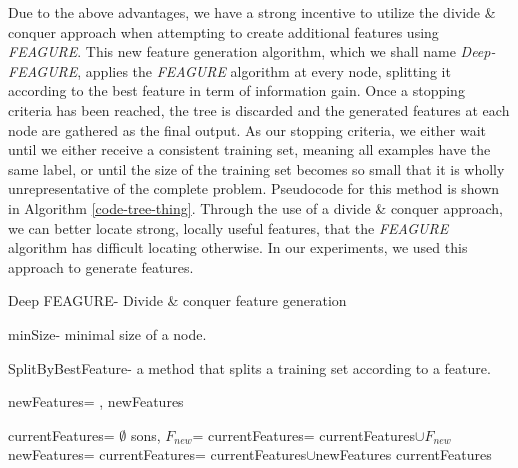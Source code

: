 \documentclass[twoside,11pt]{article}
\theoremstyle{definition}
\begin{document}
Due to the above advantages, we have a strong incentive to utilize the divide \& conquer approach when attempting to create additional features using \emph{FEAGURE}. This new feature generation algorithm, which we shall name \emph{Deep-FEAGURE}, applies the \emph{FEAGURE} algorithm at every node, splitting it according to the best feature in term of information gain. Once a stopping criteria has been reached, the tree is discarded and the generated features at each node are gathered as the final output.
As our stopping criteria, we either wait until we either receive a consistent training set, meaning all examples have the same label, or until the size of the training set becomes so small that it is wholly unrepresentative of the complete problem. 
Pseudocode for this method is shown in Algorithm \ref{code-tree-thing}.
Through the use of a divide \& conquer approach, we can better locate strong, locally useful features, that the \emph{FEAGURE} algorithm has difficult locating otherwise. In our experiments, we used this approach to generate features.

\begin{algorithm}[H]
	\caption{Deep FEAGURE- Divide \& conquer feature generation}
	\label{code-tree-thing}
	\small
	minSize- minimal size of a node.
	
	SplitByBestFeature- a method that splits a training set according to a feature.
	
	\begin{algorithmic}
		\State
		\Return 
		\EndIf
		\State newFeatures=
		\State \Return {}, newFeatures
		\EndFunction
		
		
		\State 
		\State currentFeatures= $\emptyset$
		\State sons, $F_{new}$=
		\State currentFeatures= currentFeatures$\cup F_{new}$
		\State newFeatures=
		\State currentFeatures= currentFeatures$\cup$newFeatures
		\EndFor
		\State \Return currentFeatures
		\EndFunction
	\end{algorithmic}
\end{algorithm}


\end{document}
